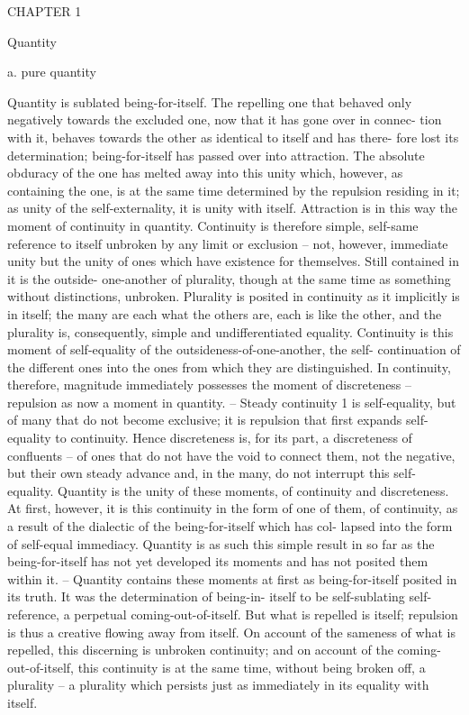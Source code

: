 CHAPTER 1

Quantity

a. pure quantity

Quantity is sublated being-for-itself. The repelling one that behaved only
negatively towards the excluded one, now that it has gone over in connec-
tion with it, behaves towards the other as identical to itself and has there-
fore lost its determination; being-for-itself has passed over into attraction.
The absolute obduracy of the one has melted away into this unity which,
however, as containing the one, is at the same time determined by the
repulsion residing in it; as unity of the self-externality, it is unity with itself.
Attraction is in this way the moment of continuity in quantity.
Continuity is therefore simple, self-same reference to itself unbroken by
any limit or exclusion – not, however, immediate unity but the unity of
ones which have existence for themselves. Still contained in it is the outside-
one-another of plurality, though at the same time as something without
distinctions, unbroken. Plurality is posited in continuity as it implicitly is
in itself; the many are each what the others are, each is like the other, and the
plurality is, consequently, simple and undifferentiated equality. Continuity
is this moment of self-equality of the outsideness-of-one-another, the self-
continuation of the different ones into the ones from which they are
distinguished.
In continuity, therefore, magnitude immediately possesses the moment
of discreteness – repulsion as now a moment in quantity. – Steady continuity 1
is self-equality, but of many that do not become exclusive; it is repulsion
that first expands self-equality to continuity. Hence discreteness is, for its
part, a discreteness of confluents – of ones that do not have the void to
connect them, not the negative, but their own steady advance and, in the
many, do not interrupt this self-equality.
Quantity is the unity of these moments, of continuity and discreteness.
At first, however, it is this continuity in the form of one of them, of
continuity, as a result of the dialectic of the being-for-itself which has col-
lapsed into the form of self-equal immediacy. Quantity is as such this simple
result in so far as the being-for-itself has not yet developed its moments and
has not posited them within it. – Quantity contains these moments at first
as being-for-itself posited in its truth. It was the determination of being-in-
itself to be self-sublating self-reference, a perpetual coming-out-of-itself.
But what is repelled is itself; repulsion is thus a creative flowing away
from itself. On account of the sameness of what is repelled, this discerning
is unbroken continuity; and on account of the coming-out-of-itself, this
continuity is at the same time, without being broken off, a plurality – a
plurality which persists just as immediately in its equality with itself.

